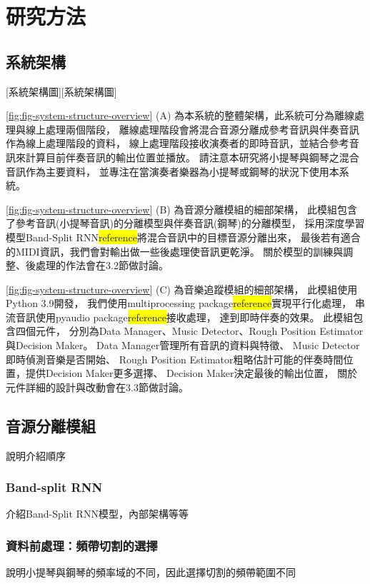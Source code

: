 \documentclass[class=NCU_thesis, crop=false]{standalone}
\begin{document}
\chapter{研究方法}

\section{系統架構}
[系統架構圖][系統架構圖]

\cref{fig:fig-system-structure-overview} (A)
為本系統的整體架構，此系統可分為離線處理與線上處理兩個階段，
離線處理階段會將混合音源分離成參考音訊與伴奏音訊作為線上處理階段的資料，
線上處理階段接收演奏者的即時音訊，並結合參考音訊來計算目前伴奏音訊的輸出位置並播放。
請注意本研究將小提琴與鋼琴之混合音訊作為主要資料，
並專注在當演奏者樂器為小提琴或鋼琴的狀況下使用本系統。

\cref{fig:fig-system-structure-overview} (B)
為音源分離模組的細部架構，
此模組包含了參考音訊(小提琴音訊)的分離模型與伴奏音訊(鋼琴)的分離模型，
採用深度學習模型Band-Split RNN{\colorbox{yellow}{reference}}將混合音訊中的目標音源分離出來，
最後若有適合的MIDI資訊，我們會對輸出做一些後處理使音訊更乾淨。
關於模型的訓練與調整、後處理的作法會在3.2節做討論。

\cref{fig:fig-system-structure-overview} (C)
為音樂追蹤模組的細部架構，
此模組使用Python 3.9開發，
我們使用multiprocessing package{\colorbox{yellow}{reference}}實現平行化處理，
串流音訊使用pyaudio package{\colorbox{yellow}{reference}}接收處理，
達到即時伴奏的效果。
此模組包含四個元件，
分別為Data Manager、Music Detector、Rough Position Estimator與Decision Maker。
Data Manager管理所有音訊的資料與特徵、
Music Detector即時偵測音樂是否開始、
Rough Position Estimator粗略估計可能的伴奏時間位置，提供Decision Maker更多選擇、
Decision Maker決定最後的輸出位置，
關於元件詳細的設計與改動會在3.3節做討論。

\pagebreak

\section{音源分離模組}
說明介紹順序

\subsection{Band-split RNN}
介紹Band-Split RNN模型，內部架構等等

\subsection{資料前處理：頻帶切割的選擇}
說明小提琴與鋼琴的頻率域的不同，因此選擇切割的頻帶範圍不同
\end{document}
